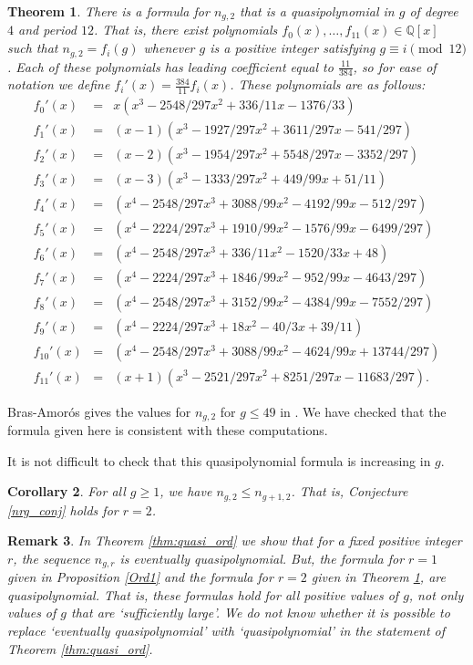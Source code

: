 \documentclass[12pt]{amsart}
\newcommand{\Q}{{\mathbb Q}}
\theoremstyle{plain}\newtheorem{proposition}{Proposition}[section]
\newtheorem{cor}[proposition]{Corollary}
\newtheorem{thm}[proposition]{Theorem}
\newtheorem{remark}[proposition]{Remark}
\begin{document}
\begin{thm}\label{Thm:ng2}
There is a formula for $n_{g,2}$ that is a quasipolynomial in $g$ of degree $4$ and period $12$.  That is, there exist polynomials $f_0(x),\ldots, f_{11}(x) \in \Q[x]$ such that $n_{g,2} = f_i(g)$ whenever $g$ is a positive integer satisfying $g \equiv i \pmod{12}$.  Each of these polynomials has leading coefficient equal to $\frac{11}{384}$, so for ease of notation we define $f_i'(x) = \frac{384}{11} f_i(x)$.  These polynomials are as follows: 
\begin{eqnarray*}
f_0'(x) & = &  x  (x^3 - 2548/297 x^2 + 336/11 x - 1376/33) \\
 f_1'(x) & = &   (x - 1) (x^3 - 1927/297 x^2 + 3611/297 x - 541/297)\\
  f_2'(x) & = & (x - 2)   (x^3 - 1954/297 x^2 + 5548/297 x - 3352/297) \\
    f_3'(x) &=& (x - 3)  (x^3 - 1333/297 x^2 + 449/99 x + 51/11)\\
  f_4'(x) &=&  (x^4 - 2548/297 x^3 + 3088/99 x^2 - 4192/99 x - 512/297)\\
 f_5'(x) &= & (x^4 - 2224/297 x^3 + 1910/99 x^2 - 1576/99 x - 6499/297)\\
  f_6'(x) &=& (x^4 - 2548/297 x^3 + 336/11 x^2 - 1520/33 x + 48)\\
    f_7'(x) &=& (x^4 - 2224/297 x^3 + 1846/99 x^2 - 952/99 x - 4643/297)\\
  f_8'(x) &= & (x^4 - 2548/297 x^3 + 3152/99 x^2 - 4384/99 x - 7552/297)\\
 f_9'(x) &= & (x^4 - 2224/297 x^3 + 18 x^2 - 40/3 x + 39/11)\\
  f_{10}'(x) &= &(x^4 - 2548/297 x^3 + 3088/99 x^2 - 4624/99 x + 13744/297)\\
    f_{11}'(x) &= & (x + 1)  (x^3 - 2521/297 x^2 + 8251/297 x - 11683/297).
\end{eqnarray*}

\end{thm}
Bras-Amor\'os gives the values for $n_{g,2}$ for $g \le 49$ in \cite{Bras-Amoros_ord}. We have checked that the formula given here is consistent with these computations.

It is not difficult to check that this quasipolynomial formula is increasing in $g$.
\begin{cor}
For all $g\ge 1$, we have $n_{g,2} \le n_{g+1,2}$.  That is, Conjecture \ref{nrg_conj} holds for $r=2$.
\end{cor}

\begin{remark}
In Theorem \ref{thm:quasi_ord} we show that for a fixed positive integer $r$, the sequence $n_{g,r}$ is \emph{eventually} quasipolynomial.  But, the formula for $r=1$ given in Proposition \ref{Ord1} and the formula for $r=2$ given in Theorem \ref{Thm:ng2}, are quasipolynomial.  That is, these formulas hold for all positive values of $g$, not only values of $g$ that are `sufficiently large'.  We do not know whether it is possible to replace `eventually quasipolynomial' with `quasipolynomial' in the statement of Theorem \ref{thm:quasi_ord}.
\end{remark}
\end{document}
